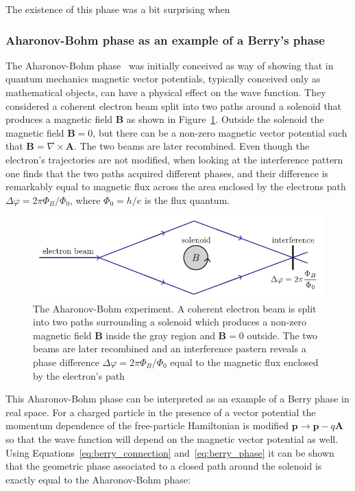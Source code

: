 The existence of this phase was a bit surprising when 

\subsubsection{Aharonov-Bohm phase as an example of a Berry's phase}

The Aharonov-Bohm phase~\cite{aharonov_significance_1959} was initially conceived as way of showing that in quantum mechanics magnetic vector potentials, typically conceived only as mathematical objects, can have a physical effect on the wave function. They considered a coherent electron beam split into two paths around a solenoid that produces a magnetic field $\mathbf{B}$ as shown in Figure~\ref{fig:aharonov_bohm}. Outside the solenoid the magnetic field $\mathbf{B}=0$, but there can be a non-zero magnetic vector potential such that $\mathbf{B}=\nabla\times\mathbf{A}$. The two beams are later recombined. Even though the electron's trajectories are not modified, when looking at the interference pattern one finds that the two paths acquired different phases, and their difference is remarkably equal to magnetic flux across the area enclosed by the electrons path $\Delta\varphi = 2\pi \Phi_B/\Phi_0$, where $\Phi_0=h/e$ is the flux quantum. 

\begin{figure}[htb]
\begin{center}
\includegraphics[]{Figures/Chapter7/aharonov_bohm.pdf}
\caption[The Aharonov-Bohm experiment]{The Aharonov-Bohm experiment. A coherent electron beam is split into two paths surrounding a solenoid which produces a non-zero magnetic field $\mathbf{B}$ inside the gray region and $\mathbf{B}=0$ outside. The two beams are later recombined and an interference pastern reveals a phase difference $\Delta\varphi = 2\pi \Phi_B/\Phi_0$ equal to the magnetic flux enclosed by the electron's path}
\label{fig:aharonov_bohm}
\end{center}
\end{figure}

This Aharonov-Bohm phase can be interpreted as an example of a Berry phase in real space. For a charged particle in the presence of a vector potential the momentum dependence of the free-particle Hamiltonian is modified $\mathbf{p}\rightarrow\mathbf{p}-q\mathbf{A}$ so that the wave function will depend on the magnetic vector potential as well. Using Equations~\ref{eq:berry_connection} and~\ref{eq:berry_phase} it can be shown that the geometric phase associated to a closed path around the solenoid is exactly equal to the Aharonov-Bohm phase: 


